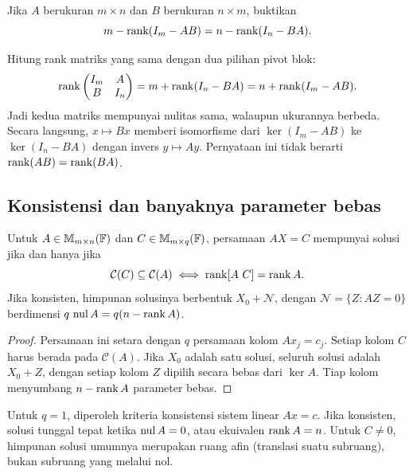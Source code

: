 \begin{exam}
    Jika $A$ berukuran $m\times n$ dan $B$ berukuran $n\times m$, buktikan
    \[
        m-\operatorname{rank}(I_m-AB)=n-\operatorname{rank}(I_n-BA).
    \]
\end{exam}
\begin{solution}
    Hitung rank matriks yang sama dengan dua pilihan pivot blok:
    \[
        \operatorname{rank}\begin{pmatrix}I_m&A\\B&I_n\end{pmatrix}
        =m+\operatorname{rank}(I_n-BA)=n+\operatorname{rank}(I_m-AB).
    \]
    Jadi kedua matriks mempunyai nulitas sama, walaupun ukurannya
    berbeda. Secara langsung, $x\mapsto Bx$ memberi isomorfisme dari
    $\ker(I_m-AB)$ ke $\ker(I_n-BA)$ dengan invers $y\mapsto Ay$.
    Pernyataan ini tidak berarti $\operatorname{rank}(AB)=\operatorname{rank}(BA)$.
\end{solution}

\subsection{Konsistensi dan banyaknya parameter bebas}

\begin{prop}
    \label{rank:ax-b}
    Untuk $A\in\mathbb{M}_{m\times n}(\mathbb{F})$ dan $C\in\mathbb{M}_{m\times q}(\mathbb{F})$,
    persamaan $AX=C$ mempunyai solusi jika dan hanya jika
    \[
        \mathcal C(C)\subseteq\mathcal C(A)
        \iff \operatorname{rank}[A\ C]=\operatorname{rank} A.
    \]
    Jika konsisten, himpunan solusinya berbentuk $X_0+\mathcal N$, dengan
    $\mathcal N=\{Z:AZ=0\}$ berdimensi $q\,\operatorname{nul} A=q(n-\operatorname{rank} A)$.
\end{prop}
\begin{proof}
    Persamaan ini setara dengan $q$ persamaan kolom $Ax_j=c_j$.
    Setiap kolom $C$ harus berada pada $\mathcal C(A)$.
    Jika $X_0$ adalah satu solusi, seluruh solusi adalah $X_0+Z$,
    dengan setiap kolom $Z$ dipilih secara bebas dari $\ker A$.
    Tiap kolom menyumbang $n-\operatorname{rank} A$ parameter bebas.
\end{proof}

Untuk $q=1$, diperoleh kriteria konsistensi sistem linear $Ax=c$.
Jika konsisten, solusi tunggal tepat ketika $\operatorname{nul} A=0$, atau ekuivalen
$\operatorname{rank} A=n$.
Untuk $C\ne0$, himpunan solusi umumnya merupakan ruang afin
(translasi suatu subruang), bukan subruang yang melalui nol.

